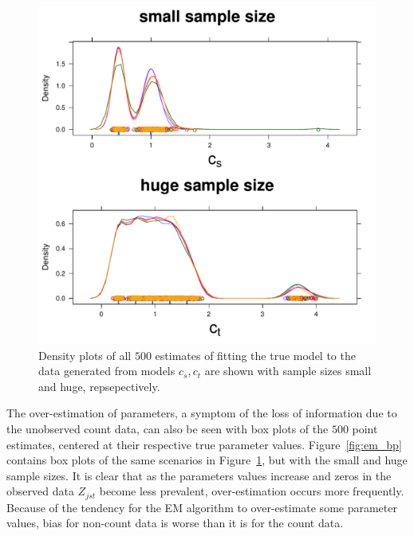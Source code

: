 \begin{figure}
  \centering
  \includegraphics[scale=0.5]{em}
  \caption{Density plots of all $500$ estimates of fitting the true model to the data generated from models $c_s,c_t$ are shown with sample sizes small and huge, repsepectively.}
  \label{fig:em}
\end{figure}

The over-estimation of parameters, a symptom of the loss of information due to the unobserved count data, can also be seen with box plots of the $500$ point estimates, centered at their respective true parameter values.  Figure~\ref{fig:em_bp} contains box plots of the same scenarios in Figure~\ref{fig:em}, but with the small and huge sample sizes.  It is clear that as the parameters values increase and zeros in the observed data $Z_{jst}$ become less prevalent, over-estimation occurs more frequently.  Because of the tendency for the EM algorithm to over-estimate some parameter values, bias for non-count data is worse than it is for the count data.  



